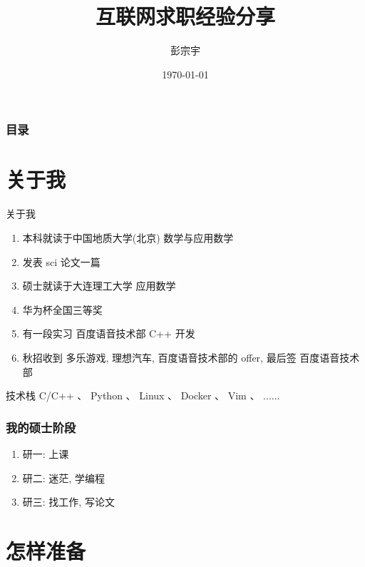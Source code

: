 \documentclass{ctexbeamer}
\title[互联网求职经验分享]{互联网求职经验分享}
\author[彭宗宇]{彭宗宇}
\institute[DLUT]{%
	大连理工大学
}
\date{\today}
\begin{document}
\maketitle

\begin{frame}
	\frametitle{\textbf{目录}}
	\tableofcontents
\end{frame}


\section{关于我}
\begin{frame}{关于我}
	\begin{enumerate}[<+-| alert@+>]
		\item 本科就读于中国地质大学(北京) 数学与应用数学
		\item 发表 sci 论文一篇
		\item 硕士就读于大连理工大学  应用数学
		\item 华为杯全国三等奖
		\item 有一段实习 百度语音技术部 C++ 开发
		\item 秋招收到 多乐游戏, 理想汽车, 百度语音技术部的 offer,  最后签 百度语音技术部
	\end{enumerate}

	\begin{block}{技术栈}
		C/C++ 、 Python 、 Linux 、 Docker 、 Vim 、 ......
	\end{block}
\end{frame}

\begin{frame}
	\frametitle{我的硕士阶段}

	\begin{enumerate}
		\item 研一: 上课
		\item 研二: 迷茫, 学编程
		\item 研三: 找工作, 写论文
	\end{enumerate}



\end{frame}


\section{怎样准备}
\end{document}
